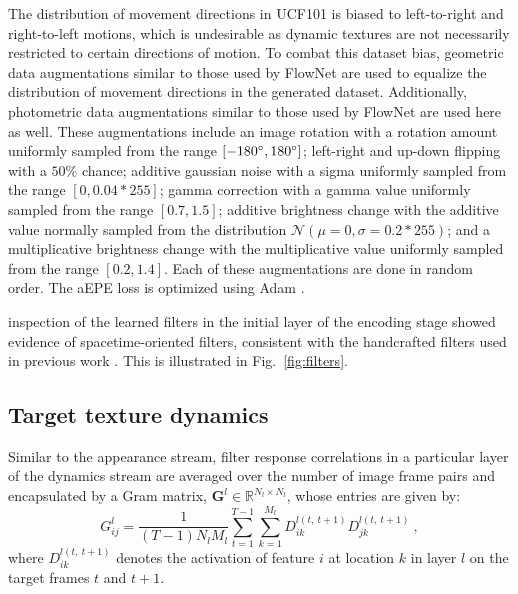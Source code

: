 The distribution of movement directions in UCF101 is biased to left-to-right and right-to-left motions, which is undesirable as dynamic textures are not necessarily restricted to certain directions of motion. To combat this dataset bias, geometric data augmentations similar to those used by FlowNet \cite{dosovitskiy2015} are used to equalize the distribution of movement directions in the generated dataset. Additionally, photometric data augmentations similar to those used by FlowNet \cite{dosovitskiy2015} are used here as well. These augmentations include an image rotation with a rotation amount uniformly sampled from the range $[-180 \degree , 180 \degree]$; left-right and up-down flipping with a $50\%$ chance; additive gaussian noise with a sigma uniformly sampled from the range $[0, 0.04*255]$; gamma correction with a gamma value uniformly sampled from the range $[0.7, 1.5]$; additive brightness change with the additive value normally sampled from the distribution $\mathcal{N}(\mu = 0, \sigma = 0.2*255)$; and a multiplicative brightness change with the multiplicative value uniformly sampled from the range $[0.2, 1.4]$. Each of these augmentations are done in random order.
The aEPE loss is optimized using Adam \cite{kingma2017}.

 inspection of the learned filters in the initial layer of the encoding stage
showed evidence of spacetime-oriented filters, consistent with
the handcrafted filters used in previous work \cite{derpanis2012spacetime}. This  is illustrated in Fig.\ \ref{fig:filters}.



\subsection{Target texture dynamics}

Similar to the appearance stream, filter response correlations
in a particular layer of the dynamics
stream are averaged over the number of image frame
pairs and encapsulated by a Gram matrix,
$\mathbf{G}^{l} \in \mathbb{R}^{N_l \times N_l}$,
whose entries are given by:
\begin{equation}
	G_{ij}^l = \frac{1}{(T-1) N_l M_l} \sum_{t=1}^{T-1} \sum_{k=1}^{M_l} D_{ik}^{l(t,\ t+1)} D_{jk}^{l(t,\ t+1)}\ ,	
\end{equation}
where $D_{ik}^{l(t,\ t+1)}$ denotes the activation of feature $i$ at
location $k$ in layer $l$ on the target frames $t$ and $t+1$.

